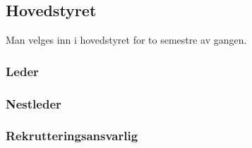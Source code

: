 \documentclass[10pt,norsk,a4paper,usenames,dvipsnames]{article}
\begin{document}
\begin{minipage}[t]{0.5\textwidth}
    \subsection{Hovedstyret}
        Man velges inn i hovedstyret for to semestre av gangen.

        \subsubsection{Leder}


        \subsubsection{Nestleder}












        \subsubsection{Rekrutteringsansvarlig}




\end{minipage}
\end{document}
